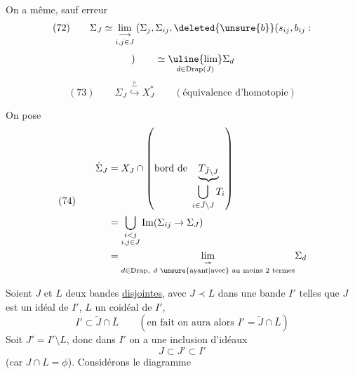 On a même, sauf erreur
\[
(72)\qquad\Sigma_J\simeq\underset{i,j\in J}{\lim_{\longrightarrow}}\left(\Sigma_j,\Sigma_{ij},\deleted{\unsure{b}}(s_{ij},b_{ij}:\right.
\]
\[
\left.\vphantom{\Sigma_{ij}}\right)\qquad\simeq\underset{d\in\mathrm{Drap}(J)}{\uline{\lim}}\Sigma_d
\]
\[
(73)\qquad\Sigma_J\overset{\overset{h}{\sim}}{\hookrightarrow}X_J^*\qquad(\text{équivalence d'homotopie})
\]

On pose
\[
(74)\qquad\begin{aligned}
\dot\Sigma_J&=X_J\cap\left(\text{bord de }\underbrace{T_{\bar J\setminus J}}_{\displaystyle\bigcup_{i\in\bar J\setminus J}T_i}\right)\\
&=\bigcup_{\substack{i<j\\i,j\in J}}\operatorname{Im}(\Sigma_{ij}\to\Sigma_J)\\
&=\underset{\substack{d\in\mathrm{Drap},\ d\text{ \unsure{ayant|avec} au moins 2 termes}}}{\lim_{\twoheadrightarrow}}\Sigma_d
\end{aligned}
\]



Soient $J$ et $L$ deux bandes \uline{disjointes}, avec $J\prec L$ dans une bande $I'$ telles que $J$ est un idéal de $I'$, $L$ un coidéal de $I'$,
\[
I'\subset\widetilde J\cap\bar L\qquad(\text{en fait on aura alors }I'=\widetilde J\cap\bar L)
\]
Soit $J'=I'\setminus L$, donc dans $I'$ on a une inclusion d'idéaux
\[J\subset J'\subset I'\]
(car $J\cap L=\phi$). Considérons  le diagramme

